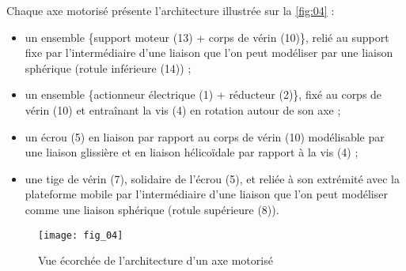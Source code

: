 Chaque axe motorisé présente l’architecture illustrée sur la \autoref{fig:04} :
\begin{itemize}
\item un ensemble \{support moteur (13) + corps de vérin (10)\}, relié au support fixe par l’intermédiaire d’une
liaison que l’on peut modéliser par une liaison sphérique (rotule inférieure (14)) ;
\item un ensemble \{actionneur électrique (1) + réducteur (2)\}, fixé au corps de vérin (10) et entraînant la vis (4)
en rotation autour de son axe ;
\item un écrou (5) en liaison par rapport au corps de vérin (10) modélisable par une liaison glissière et en liaison
hélicoïdale par rapport à la vis (4) ;
\item une tige de vérin (7), solidaire de l’écrou (5), et reliée à son extrémité avec la plateforme mobile par l’intermédiaire
d’une liaison que l’on peut modéliser comme une liaison sphérique (rotule supérieure (8)).
\end{itemize}



\begin{figure}[H]
\centering
\texttt{[image: fig\_04]}
\caption{\label{fig:04} Vue écorchée de l’architecture d’un axe motorisé }
\end{figure}


\ifprof
\begin{corrige}
\end{corrige}
\else
\fi


\ifprof
\begin{corrige}

\end{corrige}
\else
\fi


\ifprof
\begin{corrige}

\end{corrige}
\else
\fi



